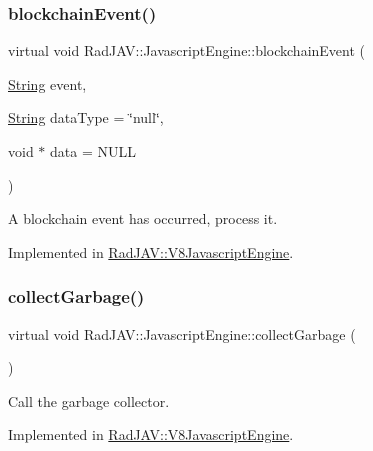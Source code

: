 \subsubsection{\texorpdfstring{blockchain\+Event()}{blockchainEvent()}}
{\footnotesize\ttfamily virtual void Rad\+J\+A\+V\+::\+Javascript\+Engine\+::blockchain\+Event (\begin{DoxyParamCaption}\item[{\mbox{\hyperlink{class_rad_j_a_v_1_1_string}{String}}}]{event,  }\item[{\mbox{\hyperlink{class_rad_j_a_v_1_1_string}{String}}}]{data\+Type = {\ttfamily \char`\"{}null\char`\"{}},  }\item[{void $\ast$}]{data = {\ttfamily NULL} }\end{DoxyParamCaption})\hspace{0.3cm}{\ttfamily [pure virtual]}}



A blockchain event has occurred, process it. 



Implemented in \mbox{\hyperlink{class_rad_j_a_v_1_1_v8_javascript_engine_a13490748bc843ae2d2be22aa889e8e30}{Rad\+J\+A\+V\+::\+V8\+Javascript\+Engine}}.

\mbox{\label{class_rad_j_a_v_1_1_javascript_engine_a07709e2f1afb9f49444c6605a7a6122f}} 
\subsubsection{\texorpdfstring{collect\+Garbage()}{collectGarbage()}}
{\footnotesize\ttfamily virtual void Rad\+J\+A\+V\+::\+Javascript\+Engine\+::collect\+Garbage (\begin{DoxyParamCaption}{ }\end{DoxyParamCaption})\hspace{0.3cm}{\ttfamily [pure virtual]}}



Call the garbage collector. 



Implemented in \mbox{\hyperlink{class_rad_j_a_v_1_1_v8_javascript_engine_ab9624aca14bbbcb2bb248d81efe8e402}{Rad\+J\+A\+V\+::\+V8\+Javascript\+Engine}}.

